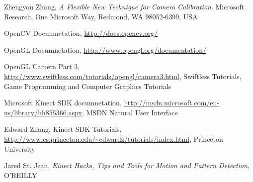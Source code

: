 \begin{thebibliography}{9}

  Zhengyou Zhang,
  \emph{A Flexible New Technique for Camera Calibration}.
  Microsoft Research, One Microsoft Way, Redmond, WA 98052-6399, USA
  
	OpenCV Documnetation,
	\url{http://docs.opencv.org/}
	
	OpenGL Documnetation,
	\url{http://www.opengl.org/documentation/}	
	
	OpenGL Camera Part 3,
	\url{http://www.swiftless.com/tutorials/opengl/camera3.html},
	Swiftless Tutorials, Game Programming and Computer Graphics Tutorials	
	
	Microsoft Kinect SDK documnetation,
	\url{http://msdn.microsoft.com/en-us/library/hh855366.aspx},
	MSDN Natural User Interface
	
	Edward Zhang, Kinect SDK Tutorials, 
	\url{http://www.cs.princeton.edu/~edwardz/tutorials/index.html},
	Princeton University
	
	Jared St. Jean,
	\emph{Kinect Hacks, Tips and Tools for Motion and Pattern Detection},
	O'REILLY
	
	

\end{thebibliography}
